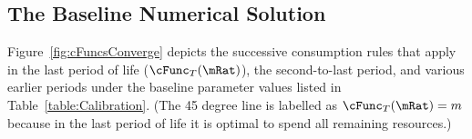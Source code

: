 \documentclass[./BufferStockTheory.tex]{subfiles}
\begin{document}
\begin{comment}
A useful alternative version is
\begin{verbatimwrite}{\EqDir/FVACAlt}
\begin{align}
    \DiscFac \Rfree \PGro^{-\CRRA} \uInvEpShkuInv^{1-\CRRA}   & < \Rfree/\PGro \nonumber
\\ \PatPGro \uInvEpShkuInv^{1/\CRRA-1}  & < (\Rfree/\PGro)^{1/\CRRA} \label{eq:FVACAlt}.
\end{align}
\end{verbatimwrite}

\end{comment}

\begin{comment}
In the case where the permanent shocks are lognormally distributed, we have
\begin{align}
\Ex[\pshk^{1-\CRRA}] & = &\exp((1-\CRRA)(-\sigma^{2}_{\pshk}/2)+(1-\CRRA)^{2}\sigma_{\pshk}^{2})
\\  & = \exp((1-\CRRA)((-1/2)+(1-\CRRA))\sigma_{\pshk}^{2})
\\  & = \exp((1-\CRRA)(1/2-\CRRA)\sigma_{\pshk}^{2})
%
\end{align}
\end{comment}

\begin{comment}
Equation
  \eqref{eq:GIC} can be raised to the $\CRRA$ power yielding the
  alternative form $(\Rfree \DiscFac) \PGroAdj^{-\CRRA} < 1$ which
  Deaton~\citeyearpar{deatonLiqConstr} imposed to guarantee that his
  problem defined a contraction mapping.
\end{comment}


\hypertarget{Baseline-Numerical-Solution}{}
\subsection{The Baseline Numerical Solution}

Figure~\ref{fig:cFuncsConverge} depicts the successive consumption
rules that apply in the last period of life ($\cFunc_{T}(\mRat)$), the
second-to-last period, and various earlier periods under the
baseline parameter values listed in Table~\ref{table:Calibration}.
(The 45 degree line is labelled as $\cFunc_{T}(\mRat) = m$ because in
the last period of life it is optimal to spend all remaining
resources.)




\providecommand{\figName}{Convergence-of-the-Consumption-Rules} %
\providecommand{\figFile}{cFuncsConverge} %
\hypertarget{\figFile}{}
\hypertarget{\figName}{}
\end{document}
